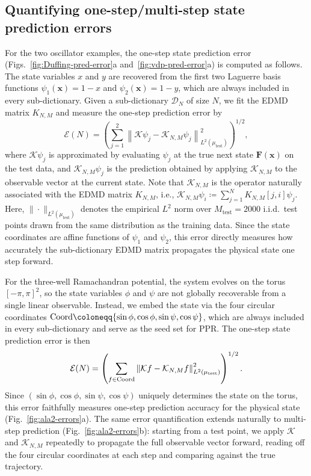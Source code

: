 \documentclass{article}
\theoremstyle{plain}
\theoremstyle{definition}
\def\Koop{\mathcal{K}}
\def\Dc{\mathcal{D}}
\newcommand{\arXivtag}[1][]{#1}
\begin{document}
	\subsection{Quantifying one-step/multi-step state prediction errors}
	For the two oscillator examples, the one-step state prediction error (Figs.~\ref{fig:Duffing-pred-error}a and~\ref{fig:vdp-pred-error}a) is computed as follows. The state variables $x$ and $y$ are recovered from the first two Laguerre basis functions $\psi_1(\mathbf{x}) = 1 - x$ and $\psi_2(\mathbf{x}) = 1 - y$, which are always included in every sub-dictionary.
	Given a sub-dictionary $\Dc_N$ of size $N$, we fit the EDMD matrix $K_{N,M}$ and measure the one-step prediction error by
	\begin{equation}
		\mathcal{E}(N) = \left( \sum_{j=1}^{2} \left\| \Koop\psi_j - \Koop_{N,M}\psi_j \right\|_{L^2(\mu_{\text{test}})}^2 \right)^{1/2},
	\end{equation}
	where $\Koop\psi_j$ is approximated by evaluating $\psi_j$ at the true next state $\mathbf{F}(\mathbf{x})$ on the test data, and $\Koop_{N,M}\psi_j$ is the prediction obtained by applying $\Koop_{N,M}$ to the observable vector at the current state. 
	Note that $\Koop_{N,M}$ is the operator naturally associated with the EDMD matrix $K_{N,M}$, i.e., $\Koop_{N,M}\psi_i \coloneqq \sum_{j=1}^N K_{N,M}[j,i]\psi_j$. 
	Here, $\|\cdot\|_{L^2(\mu_{\text{test}})}$ denotes the empirical $L^2$ norm over $M_{\text{test}} = 2000 $ i.i.d.\ test points drawn from the same distribution as the training data.
	Since the state coordinates are affine functions of $\psi_1$ and $\psi_2$, this error directly measures how accurately the sub-dictionary EDMD matrix propagates the physical state one step forward.
	
	For the three-well Ramachandran potential, the system evolves on the torus $[-\pi,\pi]^2$, so the state variables $\phi$ and $\psi$ are not globally recoverable from a single linear observable. Instead, we embed the state via the four circular coordinates $\textnormal{Coord} \coloneqq \arXivtag[\{\sin\phi,\cos\phi,\sin\psi,\cos\psi\}]$, which are always included in every sub-dictionary and serve as the seed set for PPR. The one-step state prediction error is then
	\begin{equation}
		\mathcal{E}(N) = \left( \sum_{f \in \textnormal{Coord}} \left\| \Koop f - \Koop_{N,M} f \right\|_{L^2(\mu_{\textnormal{test}})}^2 \right)^{1/2}.
	\end{equation}
	Since $(\sin\phi,\cos\phi,\sin\psi,\cos\psi)$ uniquely determines the state on the torus, this error faithfully measures one-step prediction accuracy for the physical state (Fig.~\ref{fig:ala2-errors}a).
	The same error quantification extends naturally to multi-step prediction (Fig.~\ref{fig:ala2-errors}b): starting from a test point, we apply $\Koop$ and $\Koop_{N,M}$ repeatedly to propagate the full observable vector forward, reading off the four circular coordinates at each step and comparing against the true trajectory.
	
\end{document}
